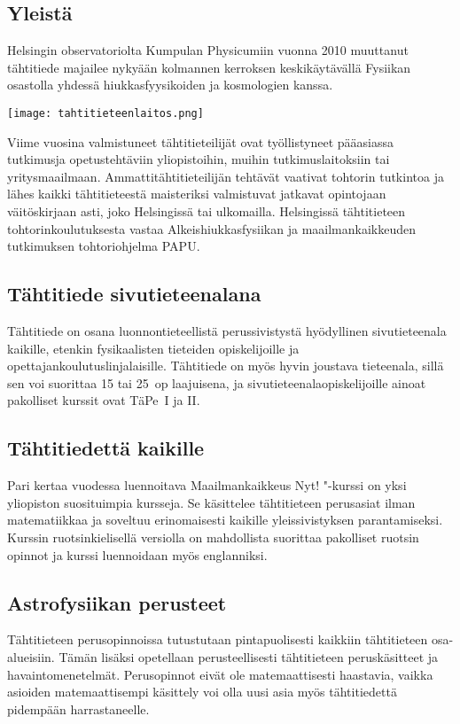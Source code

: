 \documentclass[../ala_hataile.tex]{subfiles}
\begin{document}

\subsection*{Yleistä}
Helsingin observatoriolta Kumpulan
Physicumiin vuonna 2010 muuttanut
tähtitiede majailee nykyään
kolmannen kerroksen keskikäytävällä
Fysiikan osastolla
yhdessä hiukkasfyysikoiden ja kosmologien
kanssa.

\begin{figure*}[b!]
	\texttt{[image: tahtitieteenlaitos.png]}
\end{figure*}

Viime vuosina valmistuneet tähtitieteilijät
ovat työllistyneet pääasiassa tutkimusja
opetustehtäviin yliopistoihin, muihin
tutkimuslaitoksiin tai yritysmaailmaan.
Ammattitähtitieteilijän tehtävät vaativat
tohtorin tutkintoa ja lähes kaikki tähtitieteestä
maisteriksi valmistuvat jatkavat
opintojaan väitöskirjaan asti, joko Helsingissä
tai ulkomailla. Helsingissä tähtitieteen
tohtorinkoulutuksesta vastaa Alkeishiukkasfysiikan
ja maailmankaikkeuden
tutkimuksen tohtoriohjelma PAPU.

\subsection*{Tähtitiede sivutieteenalana}
Tähtitiede on osana luonnontieteellistä
perussivistystä hyödyllinen sivutieteenala kaikille,
etenkin fysikaalisten tieteiden opiskelijoille
ja opettajankoulutuslinjalaisille.
Tähtitiede on myös hyvin joustava tieteenala,
sillä sen voi suorittaa 15 tai 25~op laajuisena, ja sivutieteenalaopiskelijoille ainoat pakolliset
kurssit ovat TäPe~I ja II.
\subsection*{Tähtitiedettä kaikille}
Pari kertaa vuodessa luennoitava Maailmankaikkeus
Nyt! "-kurssi on yksi yliopiston
suosituimpia kursseja. Se käsittelee
tähtitieteen perusasiat ilman matematiikkaa
ja soveltuu erinomaisesti kaikille yleissivistyksen
parantamiseksi. Kurssin ruotsinkielisellä
versiolla on mahdollista suorittaa
pakolliset ruotsin opinnot ja kurssi luennoidaan
myös englanniksi.
\subsection*{Astrofysiikan perusteet}
Tähtitieteen perusopinnoissa tutustutaan
pintapuolisesti kaikkiin tähtitieteen osa-alueisiin.
Tämän lisäksi opetellaan perusteellisesti
tähtitieteen peruskäsitteet ja havaintomenetelmät.
Perusopinnot eivät ole matemaattisesti haastavia, vaikka asioiden
matemaattisempi käsittely voi olla uusi asia
myös tähtitiedettä pidempään harrastaneelle.
\end{document}
